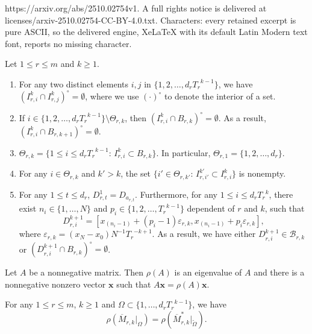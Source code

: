 \documentclass[10pt,a4paper]{amsart}
\def\wdt{\widetilde}
\newcommand{\bfx}{{\mathbf x}}
\newcommand{\mB}{{\mathcal B}}
\newcommand{\upM}{{\overline{M}}}
\begin{document}
https://arxiv.org/abs/2510.02754v1. A full rights notice is delivered at licenses/arxiv-2510.02754-CC-BY-4.0.txt. Characters: every retained excerpt is pure ASCII, so the delivered engine, XeLaTeX with its default Latin Modern text font, reports no missing character.
\begin{lem}\label{lem:Theta-simple-facts}
 Let $1\leq r\leq m$ and $k\geq 1$. 
 \begin{enumerate}
	  \item For any two distinct elements $i,j$ in $\{1,2,\ldots,d_r{T_r}^{k-1}\}$, we have $(I_{r,i}^k \cap I_{r,j}^k)^\circ =\emptyset$, where we use $(\cdot)^\circ$ to denote the interior of a set.
	  \item If $i\in\{1,2,\ldots,d_r{T_r}^{k-1}\}\setminus \Theta_{r,k}$, then $(I_{r,i}^k \cap B_{r,k})^\circ = \emptyset$. As a result, $(I_{r,i}^k \cap B_{r,k+1})^\circ = \emptyset$.
	  \item $\Theta_{r,k}=\big\{ 1 \leq  i \leq d_r {T_r}^{k-1}: \,I_{r,i}^k \subset B_{r,k}  \big\}$.	 In particular, $\Theta_{r,1}=\{1,2,\ldots,d_r\}$.
	  \item For any $i\in \Theta_{r,k}$ and $k'>k$, the set $\{i'\in \Theta_{r,k'}:\, I_{r,i'}^{k'}\subset I_{r,i}^k\}$ is nonempty.
	  \item For any $1\leq t\leq d_r$, $D_{r,t}^1=D_{a_{r,t}}$. Furthermore, for any $1\leq i\leq d_r{T_r}^k$, there exist $n_i\in\{1,\ldots,N\}$ and $p_i\in\{1,2,\ldots,{T_r}^{k-1}\}$ dependent of $r$ and $k$, such that
	  \begin{equation}\label{eq:Theta-simple-facts-1}
	    D_{r,i}^{k+1}=[x_{(n_i-1)}+(p_i-1)\varepsilon_{r,k},x_{(n_i-1)}+p_i\varepsilon_{r,k}],
	  \end{equation}
	 where $\varepsilon_{r,k}=(x_N-x_0)N^{-1}{T_r}^{-k+1}$. As a result, we have either $D_{r,i}^{k+1}\in \mB_{r,k}$ or $(D_{r,i}^{k+1}\cap B_{r,k})^\circ=\emptyset$.
  \end{enumerate}	
\end{lem}

\begin{lem}\label{lem:PFN}
Let $A$ be a nonnegative matrix. 
Then $\rho(A)$ is an eigenvalue of $A$ and there
is a nonnegative nonzero vector $\bfx$ such that $A\bfx  = \rho(A)\bfx$.

\end{lem}

\begin{lem}\label{lem:3-rho-key-lem-1}
For any $1\leq r\leq m$, $k \geq 1$ and $\Omega \subset \{ 1, \ldots, d_r {T_r}^{k-1} \}$, we
have
$$ \rho(\upM_{r,k}|_{\Omega}) = \rho( \upM_{r,k}^*|_{\wdt\Omega}).  $$
\end{lem}
\end{document}
